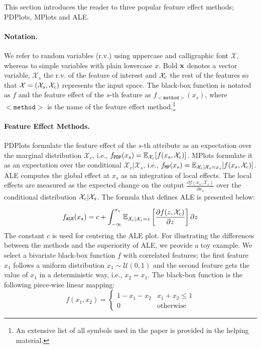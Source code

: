This section introduces the reader to three popular feature effect
methods; PDPlots, MPlots and ALE.

\paragraph*{Notation.} We refer to random variables (r.v.) using
uppercase and calligraphic font \( \mathcal{X}\), whereas to simple
variables with plain lowercase \( x \). Bold \( \mathbf{x} \) denotes a
vector variable, \( \mathcal{X}_s \) the r.v. of the feature of
interest and \( \mathcal{X}_c \) the rest of the features so that
\( \mathcal{X} = (\mathcal{X}_s, \mathcal{X}_c ) \) represents the input space. The black-box
function is notated as \( f \) and the feature effect of the \(s\)-th
feature as \(f_{\mathtt{<method>}}(x_s)\), where \(\mathtt{<method>}\)
is the name of the feature effect method.\footnote{An extensive list
  of all symbols used in the paper is provided in the helping material.}

\paragraph{Feature Effect Methods.} PDPlots formulate the feature
effect of the \(s\)-th attribute as an expectation over the marginal
distribution \(\mathcal{X}_c\), i.e.,
\(f_{\mathtt{PDP}}(x_s) =
\mathbb{\mathbb{E}}_{\mathcal{X}_c}[f(x_s,\mathcal{X}_c)]\). MPlots formulate
it as an expectation over the conditional
\(\mathcal{X}_c|\mathcal{X}_s\), i.e.,
\(f_{\mathtt{MP}}(x_s) = \mathbb{E}_{\mathcal{X}_c|\mathcal{X}_s = x_s}[f(x_s,
\mathcal{X}_c)]\). ALE computes the global effect at \(x_s\) as an
integration of local effects. The local effects are measured as the
expected change on the output
\( \frac{\partial f(x_s, \mathcal{X}_c)}{\partial x_s} \) over the
conditional distribution \( \mathcal{X}_c|\mathcal{X}_s\). The formula that
defines ALE is presented below:

\begin{gather}
  \label{eq:ALE} f_{\mathtt{ALE}}(x_s) = c + \int_{-\infty}^{x_s} \mathbb{E}_{\mathcal{X}_c|\mathcal{X}_s=z}\left[\frac{\partial f(z, \mathcal{X}_c)}{\partial z}\right] \partial z
\end{gather}
%
The constant \(c\) is used for centering the ALE plot. For
illustrating the differences between the methods and the superiority
of ALE, we provide a toy example. We select a bivariate black-box
function \(f\) with correlated features; the first feature \( x_1 \)
follows a uniform distribution \( x_1 \sim \mathcal{U}(0,1)\) and the
second feature gets the value of \(x_1\) in a deterministic way, i.e.,
\( x_2 = x_1 \). The black-box function is the following piece-wise
linear mapping:
%
\begin{equation} \label{eq:example-1-mapping} f(x_1, x_2) =
  \begin{cases} 1 - x_1 - x_2 & x_1 + x_2 \leq 1 \\ 0 & \text{otherwise}
  \end{cases}
\end{equation}
\noindent

